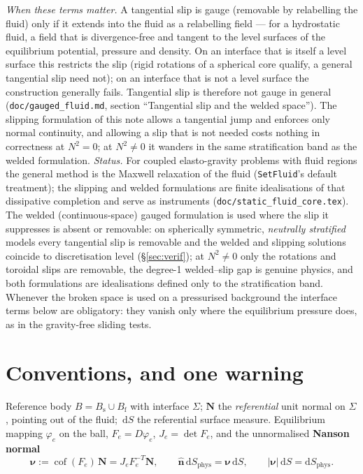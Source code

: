\documentclass[11pt]{article}
\newcommand{\Bs}{B_{\mathrm{s}}}
\newcommand{\Bf}{B_{\mathrm{f}}}
\newcommand{\bnu}{\bm{\nu}}
\newcommand{\bN}{\mathbf{N}}
\newcommand{\dS}{\,\mathrm{d}S}
\newcommand{\cof}{\operatorname{cof}}
\begin{document}
\emph{When these terms matter.} A tangential slip is gauge (removable
by relabelling the fluid) only if it extends into the fluid as a
relabelling field --- for a hydrostatic fluid, a field that is
divergence-free and tangent to the level surfaces of the equilibrium
potential, pressure and density. On an interface that is itself a level
surface this restricts the slip (rigid rotations of a spherical core
qualify, a general tangential slip need not); on an interface that is
not a level surface the construction generally fails. Tangential slip
is therefore not gauge in general (\texttt{doc/gauged\_fluid.md},
section ``Tangential slip and the welded space''). The slipping
formulation of this note allows a tangential
jump and enforces only normal continuity, and allowing a slip that is
not needed costs nothing in correctness at $N^2 = 0$; at $N^2 \neq 0$ it
wanders in the same stratification band as the welded formulation.
\emph{Status.} For coupled elasto-gravity problems with fluid regions the
general method is the Maxwell relaxation of the fluid (\texttt{SetFluid}'s
default treatment); the slipping and welded formulations are finite
idealisations of that dissipative completion and serve as instruments
(\texttt{doc/static\_fluid\_core.tex}). The welded (continuous-space)
gauged formulation is used where the slip it suppresses is absent or
removable: on spherically symmetric, \emph{neutrally stratified} models
every tangential slip is removable and the welded and slipping solutions
coincide to discretisation level (\S\ref{sec:verif}); at $N^2 \neq 0$
only the rotations and toroidal slips are removable, the degree-1
welded--slip gap is genuine physics, and both formulations are
idealisations defined only to the stratification band. Whenever the broken space is
used on a pressurised background the interface terms below are
obligatory: they vanish only where the equilibrium pressure does, as in
the gravity-free sliding tests.

\section{Conventions, and one warning}
\label{sec:conv}

Reference body $B = \Bs \cup \Bf$ with interface $\Sigma$; $\bN$ the
\emph{referential} unit normal on $\Sigma$, pointing out of the fluid;
$\dS$ the referential surface measure. Equilibrium mapping
$\varphi_e$ on the ball, $F_e = D\varphi_e$, $J_e = \det F_e$, and the
unnormalised \textbf{Nanson normal}
\begin{equation}
  \bnu := \cof(F_e)\,\bN = J_e F_e^{-T}\bN,
  \qquad
  \hat{\mathbf{n}}\,\mathrm{d}S_{\mathrm{phys}} = \bnu \dS,
  \qquad
  |\bnu|\dS = \mathrm{d}S_{\mathrm{phys}} .
  \label{eq:nanson}
\end{equation}
\end{document}
